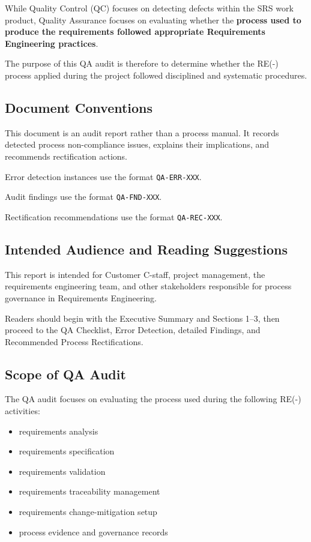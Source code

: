 \documentclass[11pt,a4paper]{article}
\begin{document}
While Quality Control (QC) focuses on detecting defects within the SRS work product, Quality Assurance focuses on evaluating whether the \textbf{process used to produce the requirements followed appropriate Requirements Engineering practices}.

The purpose of this QA audit is therefore to determine whether the RE(-) process applied during the project followed disciplined and systematic procedures.

\subsection{Document Conventions}

This document is an audit report rather than a process manual. It records detected process non-compliance issues, explains their implications, and recommends rectification actions.

Error detection instances use the format \texttt{QA-ERR-XXX}.

Audit findings use the format \texttt{QA-FND-XXX}.

Rectification recommendations use the format \texttt{QA-REC-XXX}.

\subsection{Intended Audience and Reading Suggestions}

This report is intended for Customer C-staff, project management, the requirements engineering team, and other stakeholders responsible for process governance in Requirements Engineering.

Readers should begin with the Executive Summary and Sections 1--3, then proceed to the QA Checklist, Error Detection, detailed Findings, and Recommended Process Rectifications.

\subsection{Scope of QA Audit}

The QA audit focuses on evaluating the process used during the following RE(-) activities:

\begin{itemize}[leftmargin=*]
\item requirements analysis
\item requirements specification
\item requirements validation
\item requirements traceability management
\item requirements change-mitigation setup
\item process evidence and governance records
\end{itemize}
\end{document}
